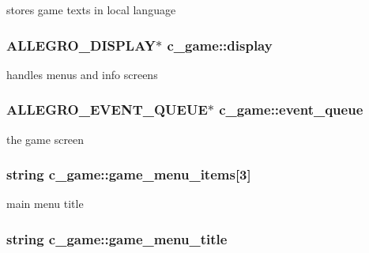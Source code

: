 stores game texts in local language \hypertarget{classc__game_aa9c205a51cef10ec977e732c750e64b8}{
\subsubsection[{display}]{\setlength{\rightskip}{0pt plus 5cm}A\-L\-L\-E\-G\-R\-O\-\_\-\-D\-I\-S\-P\-L\-A\-Y$\ast$ c\-\_\-game\-::display\hspace{0.3cm}{\ttfamily [protected]}}}\label{classc__game_aa9c205a51cef10ec977e732c750e64b8}
handles menus and info screens \hypertarget{classc__game_ab0ea00eb13e7bda75d2e217d98f4a289}{
\subsubsection[{event\-\_\-queue}]{\setlength{\rightskip}{0pt plus 5cm}A\-L\-L\-E\-G\-R\-O\-\_\-\-E\-V\-E\-N\-T\-\_\-\-Q\-U\-E\-U\-E$\ast$ c\-\_\-game\-::event\-\_\-queue\hspace{0.3cm}{\ttfamily [protected]}}}\label{classc__game_ab0ea00eb13e7bda75d2e217d98f4a289}
the game screen \hypertarget{classc__game_ab8e77c697dcb6affc55ad8263f59afe7}{
\subsubsection[{game\-\_\-menu\-\_\-items}]{\setlength{\rightskip}{0pt plus 5cm}string c\-\_\-game\-::game\-\_\-menu\-\_\-items\mbox{[}3\mbox{]}\hspace{0.3cm}{\ttfamily [protected]}}}\label{classc__game_ab8e77c697dcb6affc55ad8263f59afe7}
main menu title \hypertarget{classc__game_a7a1be955cd73845fcb5efd067959982e}{
\subsubsection[{game\-\_\-menu\-\_\-title}]{\setlength{\rightskip}{0pt plus 5cm}string c\-\_\-game\-::game\-\_\-menu\-\_\-title\hspace{0.3cm}{\ttfamily [protected]}}}\label{classc__game_a7a1be955cd73845fcb5efd067959982e}
